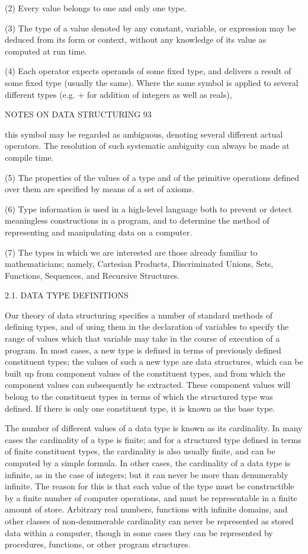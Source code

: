 (2) Every value belongs to one and only one type.

(3) The type of a value denoted by any constant, variable, or expression may be deduced from its form or context, without any knowledge of its value as computed at run time.

(4) Each operator expects operands of some fixed type, and delivers a result of some fixed type (usually the same). Where the same symbol is applied to several different types (e.g. + for addition of integers as well as reals),

NOTES ON DATA STRUCTURING 93

this symbol may be regarded as ambiguous, denoting several different actual operators. The resolution of such systematic ambiguity can always be made at compile time.

(5) The properties of the values of a type and of the primitive operations defined over them are specified by means of a set of axioms.

(6) Type information is used in a high-level language both to prevent or detect meaningless constructions in a program, and to determine the method of representing and manipulating data on a computer.

(7) The types in which we are interested are those already familiar to mathematicians; namely, Cartesian Products, Discriminated Unions, Sets, Functions, Sequences, and Recursive Structures.

2.1. DATA TYPE DEFINITIONS

Our theory of data structuring specifies a number of standard methods of defining types, and of using them in the declaration of variables to specify the range of values which that variable may take in the course of execution of a program. In most cases, a new type is defined in terms of previously defined constituent types; the values of such a new type are data structures, which can be built up from component values of the constituent types, and from which the component values can subsequently be extracted. These component values will belong to the constituent types in terms of which the structured type was defined. If there is only one constituent type, it is known as the base type.

The number of different values of a data type is known as its cardinality. In many cases the cardinality of a type is finite; and for a structured type defined in terms of finite constituent types, the cardinality is also usually finite, and can be computed by a simple formula. In other cases, the cardinality of a data type is infinite, as in the case of integers; but it can never be more than denumerably infinite. The reason for this is that each value of the type must be constructible by a finite number of computer operations, and must be representable in a finite amount of store. Arbitrary real numbers, functions with infinite domains, and other classes of non-denumerable cardinality can never be represented as stored data within a computer, though in some cases they can be represented by procedures, functions, or other program structures.

